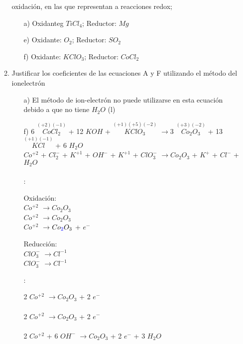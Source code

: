 \documentclass[../Práctica.root.tex]{subfiles}
\newcommand{\lra}{\ensuremath{\longrightarrow{}}}
\newcommand{\sr}[2]{\stackrel{#1}{#2}}
\begin{document}
\begin{enumerate}
\begin{enumerate}
                    oxidación, en las que representan a reacciones redox;
                    \begin{enumerate}
                        \item[a)] Oxidanteg $TiCl_4$; Reductor: $Mg$
                        \item[e)] Oxidante: $O_2$; Reductor: $SO_2$
                        \item[f)] Oxidante: $KClO_3$; Reductor: $CoCl_2$
                    \end{enumerate}
              \item Justificar los coeficientes de las ecuaciones A y F utilizando el método del ionelectrón
                    \begin{itemize}
                        \item[a)] El método de ion-electrón no puede utilizarse en esta ecuación debido a que no tiene $H_2O$ (l)
                        \item[f)] 6 $\sr{(+2)(-1)}{CoCl_2}$ + 12 $KOH$ + $\sr{(+1)(+5)(-2)}{KClO_3}$
                              \lra 3 $\sr{(+3)(-2)}{Co_2O_3}$ + 13 $\sr{(+1)(-1)}{KCl}$ + 6 $H_2O$ \\
                              $Co^{+2}$ + $Cl_2^-$ + $K^{+1}$ + $OH^-$ + $K^{+1}$ + $ClO_3^-$ \lra $Co_2O_3$ + $K^+$ + $Cl^-$ + $H_2O$ \\ \\
                              :
                              \begin{multicols}{2}
                                  Oxidación: \\
                                  $Co^{+2}$ \lra $Co_2O_3$ \\
                                  $Co^{+2}$ \lra $Co_2O_3$  \\
                                   $Co^{+2}$ \lra $Co\textcolor{blue}{_2}O_3$ +  $e^-$

                                  \columnbreak

                                  Reducción: \\
                                  $ClO_3^-$ \lra $Cl^{-1}$ \\
                                  $ClO_3^-$  \lra $Cl^{-1}$
                              \end{multicols}
                              :
                              \begin{multicols}{2}
                                  2 $Co^{+2}$ \lra $Co_2O_3$ + 2 $e^-$ \\
                                   \\
                                  2 $Co^{+2}$  \lra $Co_2O_3$ + 2 $e^-$  \\
                                   \\
                                  2 $Co^{+2}$ + 6 $OH^-$ \lra $Co_2O_3$ + 2 $e^-$ + 3 $H_2O$


\end{multicols}
\end{itemize}
\end{enumerate}
\end{enumerate}
\end{document}
